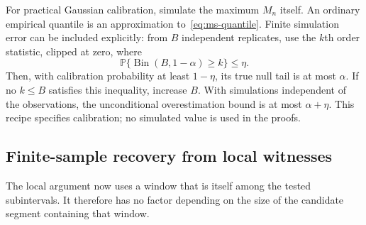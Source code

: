 \documentclass[pdflatex,sn-mathphys-num]{sn-jnl}
\newcommand{\Prob}{\mathbb P}
\theoremstyle{thmstyleone}
\theoremstyle{thmstyletwo}
\begin{document}
For practical Gaussian calibration, simulate the maximum $M_n$ itself.
An ordinary empirical quantile is an approximation to~\eqref{eq:ms-quantile}.
Finite simulation error can be included explicitly: from $B$ independent
replicates, use the $k$th order statistic, clipped at zero, where
\[
\Prob\{\operatorname{Bin}(B,1-\alpha)\ge k\}\le\eta.
\]
Then, with calibration probability at least $1-\eta$, its true null tail
is at most $\alpha$. If no $k\le B$ satisfies this inequality, increase $B$.
With simulations independent of the observations, the unconditional
overestimation bound is at most $\alpha+\eta$. This recipe specifies
calibration; no simulated value is used in the proofs.

\subsection{Finite-sample recovery from local witnesses}

The local argument now uses a window that is itself among the tested
subintervals. It therefore has no factor depending on the size of the
candidate segment containing that window.
\end{document}
